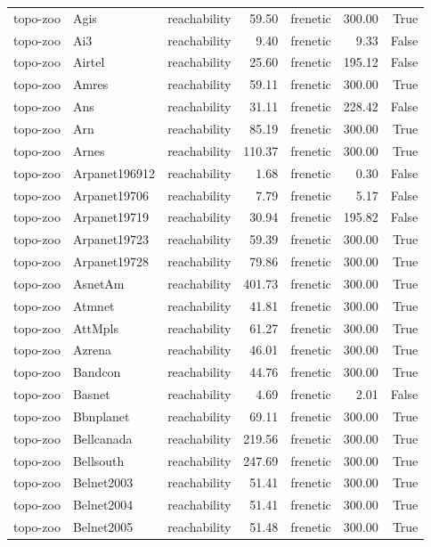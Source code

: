 \begin{tabular}{lllrlrr}
topo-zoo & Agis & reachability & 59.50 & frenetic & 300.00 & True \\
topo-zoo & Ai3 & reachability & 9.40 & frenetic & 9.33 & False \\
topo-zoo & Airtel & reachability & 25.60 & frenetic & 195.12 & False \\
topo-zoo & Amres & reachability & 59.11 & frenetic & 300.00 & True \\
topo-zoo & Ans & reachability & 31.11 & frenetic & 228.42 & False \\
topo-zoo & Arn & reachability & 85.19 & frenetic & 300.00 & True \\
topo-zoo & Arnes & reachability & 110.37 & frenetic & 300.00 & True \\
topo-zoo & Arpanet196912 & reachability & 1.68 & frenetic & 0.30 & False \\
topo-zoo & Arpanet19706 & reachability & 7.79 & frenetic & 5.17 & False \\
topo-zoo & Arpanet19719 & reachability & 30.94 & frenetic & 195.82 & False \\
topo-zoo & Arpanet19723 & reachability & 59.39 & frenetic & 300.00 & True \\
topo-zoo & Arpanet19728 & reachability & 79.86 & frenetic & 300.00 & True \\
topo-zoo & AsnetAm & reachability & 401.73 & frenetic & 300.00 & True \\
topo-zoo & Atmnet & reachability & 41.81 & frenetic & 300.00 & True \\
topo-zoo & AttMpls & reachability & 61.27 & frenetic & 300.00 & True \\
topo-zoo & Azrena & reachability & 46.01 & frenetic & 300.00 & True \\
topo-zoo & Bandcon & reachability & 44.76 & frenetic & 300.00 & True \\
topo-zoo & Basnet & reachability & 4.69 & frenetic & 2.01 & False \\
topo-zoo & Bbnplanet & reachability & 69.11 & frenetic & 300.00 & True \\
topo-zoo & Bellcanada & reachability & 219.56 & frenetic & 300.00 & True \\
topo-zoo & Bellsouth & reachability & 247.69 & frenetic & 300.00 & True \\
topo-zoo & Belnet2003 & reachability & 51.41 & frenetic & 300.00 & True \\
topo-zoo & Belnet2004 & reachability & 51.41 & frenetic & 300.00 & True \\
topo-zoo & Belnet2005 & reachability & 51.48 & frenetic & 300.00 & True \\

\end{tabular}
